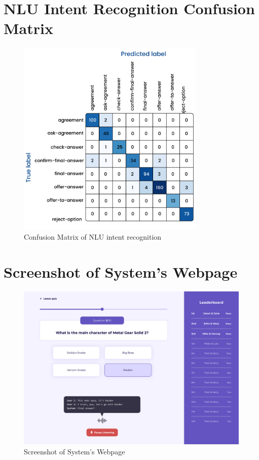 \documentclass[hidelinks, 11pt]{article}
\begin{document}
\clearpage
\onecolumn
\appendix

\section{NLU Intent Recognition Confusion Matrix}
\label{app:cm_intent_recognition}

\begin{figure}[h!]
  \centering
  \includegraphics[width=0.8\textwidth]{images/intent_confusion_matrix.jpg}
  \caption{Confusion Matrix of NLU intent recognition}
\end{figure}

\newpage

\section{Screenshot of System's Webpage}
\label{app:system_webpage}

\begin{figure}[h!]
  \centering
  \includegraphics[width=\textwidth]{images/webpage.png}
  \caption{Screenshot of System's Webpage}
\end{figure}
\end{document}
